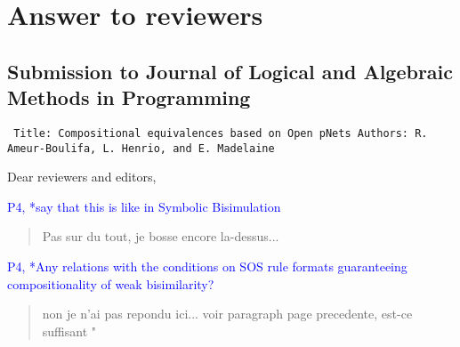 \documentclass[10pt]{article}
\newenvironment{ttbox}{\begin{alltt}\small\tt}%
                      {\end{alltt}}
\newcommand{\ERIC}[1]{\textcolor{blue}{#1}}
\begin{document}
\section*{Answer to reviewers }
\subsection*{Submission to Journal of Logical and Algebraic Methods in Programming}
\medskip
\begin{ttbox}
Title: Compositional equivalences based on Open pNets
Authors: R. Ameur-Boulifa, L. Henrio, and E. Madelaine
\end{ttbox}
\bigskip
Dear reviewers and editors,



\ERIC{P4, *say that this is like in Symbolic Bisimulation}
\begin{quote}Pas sur du tout, je bosse encore la-dessus...
\end{quote}

\ERIC{P4, *Any relations with the conditions on SOS rule formats guaranteeing compositionality of weak bisimilarity?}
\begin{quote} non je n'ai pas repondu ici... voir paragraph page precedente, est-ce suffisant "
\end{quote}
\end{document}
